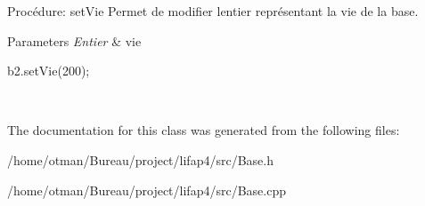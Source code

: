 Procédure\+: set\+Vie Permet de modifier l\textquotesingle{}entier représentant la vie de la base. 


\begin{DoxyParams}{Parameters}
{\em Entier} & vie 
\begin{DoxyCode}
b2.setVie(200);
\end{DoxyCode}
 \\
\hline
\end{DoxyParams}


The documentation for this class was generated from the following files\+:\begin{DoxyCompactItemize}
\item 
/home/otman/\+Bureau/project/lifap4/src/Base.\+h\item 
/home/otman/\+Bureau/project/lifap4/src/Base.\+cpp\end{DoxyCompactItemize}
